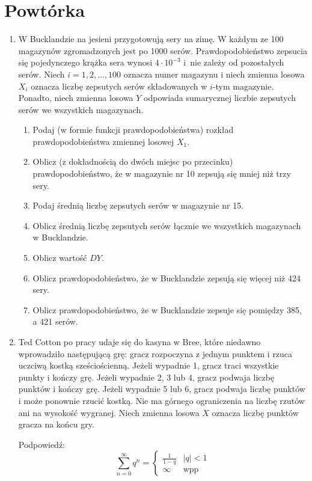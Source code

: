 \documentclass[twoside]{mwart}
\begin{document}
\section{Powtórka}
\begin{enumerate}
	\item W Bucklandzie na jesieni przygotowują sery na zimę. W każdym ze 100 magazynów
	zgromadzonych jest po 1000 serów. Prawdopodobieństwo zepsucia się pojedynczego
	krążka sera wynosi $4\cdot 10^{-3}$ i~nie zależy od pozostałych serów. Niech
	$i=1,2,\ldots,100$ oznacza numer magazynu i niech zmienna losowa $X_i$ oznacza
	liczbę zepsutych serów składowanych w $i$-tym magazynie. Ponadto, niech zmienna
	losowa $Y$ odpowiada sumarycznej liczbie zepsutych serów
	we wszystkich magazynach.
	
	\begin{enumerate}
		\item Podaj  (w formie funkcji prawdopodobieństwa) rozkład prawdopodobieństwa zmiennej losowej $X_1$.
		\item Oblicz (z dokładnością do dwóch miejsc po przecinku) prawdopodobieństwo, że w magazynie nr 10 zepsują się mniej niż trzy sery.
		\item Podaj średnią liczbę zepsutych serów w magazynie nr 15.
		\item Oblicz średnią liczbę zepsutych serów łącznie we wszystkich magazynach w Bucklandzie.
		\item Oblicz wartość $DY$.
		\item Oblicz prawdopodobieństwo, że w Bucklandzie zepsują się więcej niż 424 sery.
		\item Oblicz prawdopodobieństwo, że w Bucklandzie zepsuje się pomiędzy 385, a 421 serów.
	\end{enumerate}

\item Ted Cotton po pracy udaje się do kasyna w Bree, które niedawno wprowadziło następującą grę: gracz rozpoczyna z jednym punktem i rzuca uczciwą kostką sześciościenną.
Jeżeli wypadnie 1, gracz traci wszystkie punkty i kończy grę.
Jeżeli wypadnie 2, 3 lub 4, gracz podwaja liczbę punktów i kończy grę.
Jeżeli wypadnie 5 lub 6, gracz podwaja liczbę punktów i może ponownie rzucić kostką.
Nie ma górnego ograniczenia na liczbę rzutów ani na wysokość wygranej.
Niech zmienna losowa $X$ oznacza liczbę punktów gracza na końcu gry.

Podpowiedź: \[
\sum_{n=0}^\infty q^n = 
\begin{cases} 
\frac{1}{1-q} & \left|q\right|<1 \\
\infty & \text{wpp}
\end{cases}
\]


\end{enumerate}
\end{document}
